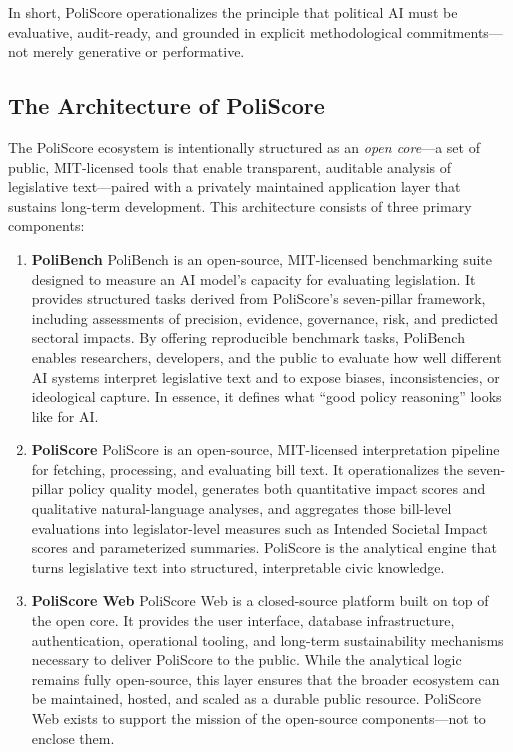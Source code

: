 \documentclass[12pt]{article}
\begin{document}
In short, PoliScore operationalizes the principle that political AI must be evaluative, audit-ready, and grounded in
explicit methodological commitments—not merely generative or performative.



\subsection{The Architecture of PoliScore}

The PoliScore ecosystem is intentionally structured as an \emph{open core}—a set of public, MIT-licensed tools that
enable transparent, auditable analysis of legislative text—paired with a privately maintained application layer that
sustains long-term development. This architecture consists of three primary components:

\begin{enumerate}
    \item \textbf{PoliBench}  
    PoliBench is an open-source, MIT-licensed benchmarking suite designed to measure an AI model's capacity for
    evaluating legislation. It provides structured tasks derived from PoliScore’s seven-pillar framework, including
    assessments of precision, evidence, governance, risk, and predicted sectoral
    impacts. By offering reproducible benchmark tasks, PoliBench enables researchers, developers, and the public to
    evaluate how well different AI systems interpret legislative text and to expose biases, inconsistencies, or
    ideological capture. In essence, it defines what “good policy reasoning” looks like for AI.

    \item \textbf{PoliScore}  
    PoliScore is an open-source, MIT-licensed interpretation pipeline for fetching, processing, and evaluating bill
    text. It operationalizes the seven-pillar policy quality model, generates both quantitative impact scores and
    qualitative natural-language analyses, and aggregates those bill-level evaluations into legislator-level measures
    such as Intended Societal Impact scores and parameterized summaries. PoliScore is the analytical engine that turns
    legislative text into structured, interpretable civic knowledge.

    \item \textbf{PoliScore Web}  
    PoliScore Web is a closed-source platform built on top of the open core. It provides the user interface, database
    infrastructure, authentication, operational tooling, and long-term sustainability mechanisms necessary to deliver
    PoliScore to the public. While the analytical logic remains fully open-source, this layer ensures that the broader
    ecosystem can be maintained, hosted, and scaled as a durable public resource. PoliScore Web exists to support the
    mission of the open-source components—not to enclose them.
\end{enumerate}
\end{document}
